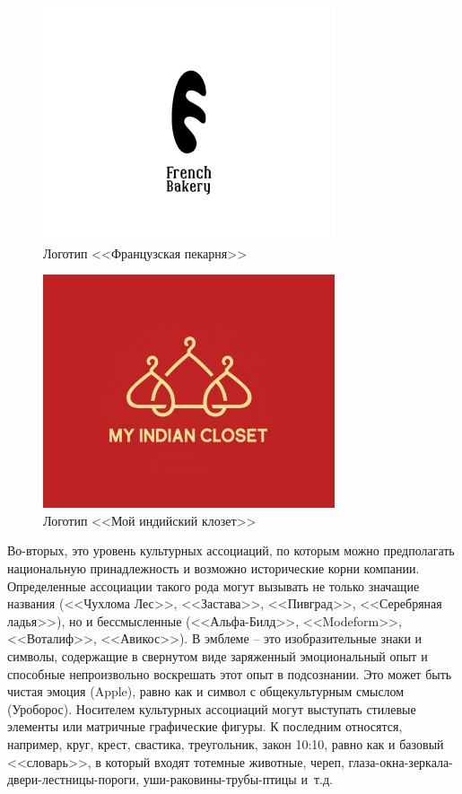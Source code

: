 \begin{figure}[h!]
  \centering
  \includegraphics[width=.5\linewidth]{images/frenchb}
  \caption{Логотип <<Французская пекарня>>}
  \label{fig:indiancloset}
\end{figure}

\begin{figure}[h!]
  \centering
  \includegraphics[width=.5\linewidth]{images/indiancloset}
  \caption{Логотип <<Мой индийский клозет>>}
  \label{fig:indiancloset}
\end{figure}

Во-вторых, это уровень культурных ассоциаций, по которым можно предполагать
национальную принадлежность и возможно  исторические корни компании. Определенные
ассоциации такого рода могут вызывать не только значащие
названия (<<Чухлома Лес>>, <<Застава>>, <<Пивград>>, <<Серебряная ладья>>), но
и бессмысленные (<<Альфа-Билд>>, <<Modeform>>, <<Воталиф>>, <<Авикос>>).
В эмблеме -- это изобразительные знаки и символы, содержащие в свернутом виде
заряженный эмоциональный опыт и способные непроизвольно воскрешать этот опыт
в подсознании. Это может быть чистая эмоция (Apple), равно как и символ с
общекультурным смыслом (Уроборос). Носителем культурных ассоциаций могут
выступать стилевые элементы или матричные графические фигуры. К последним
относятся, например, круг, крест, свастика, треугольник, закон 10:10,
равно как и базовый <<словарь>>, в который входят тотемные животные, череп,
глаза-окна-зеркала-двери-лестницы-пороги, уши-раковины-трубы-птицы
и~т.д\autocite{grigorevalj}.

